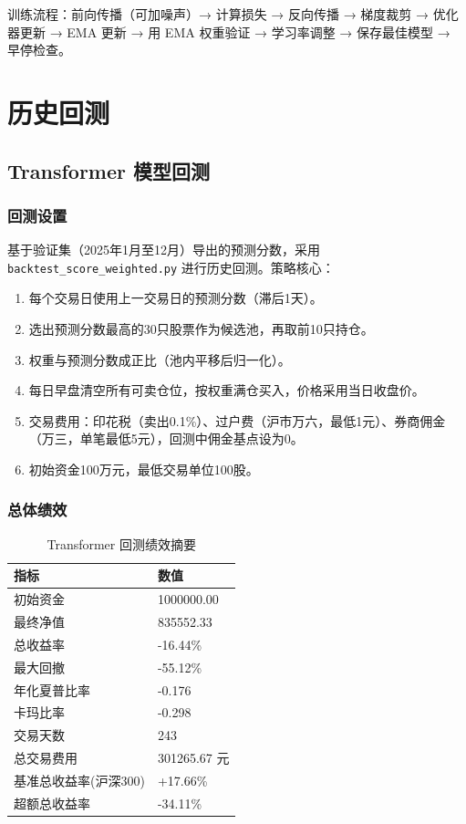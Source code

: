 \documentclass[12pt,a4paper]{ctexart}
\begin{document}
	训练流程：前向传播（可加噪声）→ 计算损失 → 反向传播 → 梯度裁剪 → 优化器更新 → EMA 更新 → 用 EMA 权重验证 → 学习率调整 → 保存最佳模型 → 早停检查。
	
	\section{历史回测}
	
	\subsection{Transformer 模型回测}
	
	\subsubsection{回测设置}
	基于验证集（2025年1月至12月）导出的预测分数，采用 \texttt{backtest\_score\_weighted.py} 进行历史回测。策略核心：
	\begin{enumerate}
		\item 每个交易日使用上一交易日的预测分数（滞后1天）。
		\item 选出预测分数最高的30只股票作为候选池，再取前10只持仓。
		\item 权重与预测分数成正比（池内平移后归一化）。
		\item 每日早盘清空所有可卖仓位，按权重满仓买入，价格采用当日收盘价。
		\item 交易费用：印花税（卖出0.1\%）、过户费（沪市万六，最低1元）、券商佣金（万三，单笔最低5元），回测中佣金基点设为0。
		\item 初始资金100万元，最低交易单位100股。
	\end{enumerate}
	
	\subsubsection{总体绩效}
	\begin{table}[H]
		\centering
		\caption{Transformer 回测绩效摘要}
		\label{tab:summary}
		\begin{tabular}{ll}
			\toprule
			指标 & 数值 \\
			\midrule
			初始资金 & 1000000.00 \\
			最终净值 & 835552.33 \\
			总收益率 & -16.44\% \\
			最大回撤 & -55.12\% \\
			年化夏普比率 & -0.176 \\
			卡玛比率 & -0.298 \\
			交易天数 & 243 \\
			总交易费用 & 301265.67 元 \\
			基准总收益率(沪深300) & +17.66\% \\
			超额总收益率 & -34.11\% \\
			\bottomrule
		\end{tabular}
	\end{table}
	
\end{document}
